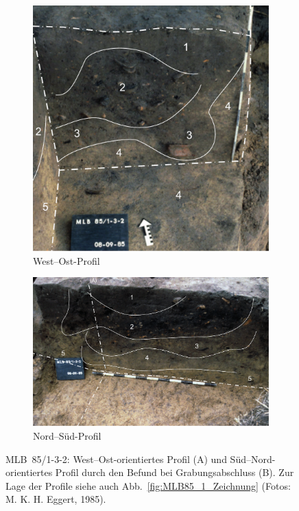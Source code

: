\begin{figure}[!tb]
	\begin{subfigure}{0.37\textwidth}
		\centering
		\includegraphics[width=\textwidth]{fig/MLB85-132_E85-032-23.pdf}
		\caption{West--Ost-Profil}
		\label{fig:MLB85-132_W-O-Prof}
	\end{subfigure}\hspace{0.01\textwidth}
	\begin{subfigure}{0.61\textwidth}
		\centering
		\includegraphics[width=\textwidth]{fig/MLB85-132_E85-032-27.pdf}
		\caption{Nord--Süd-Profil}
		\label{fig:MLB85-132_N-S-Prof}
	\end{subfigure}
	\caption{MLB~85/1-3-2: West--Ost-orientiertes Profil (A) und Süd--Nord-orientiertes Profil durch den Befund bei Grabungsabschluss (B). Zur Lage der Profile siehe auch Abb.~\ref{fig:MLB85_1_Zeichnung} (Fotos: M. K. H. Eggert, 1985).}
	\label{fig:MLB85-1-3-2_NordProfil}
\end{figure}

